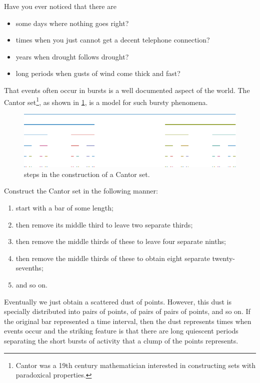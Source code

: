 \documentclass[11pt,a4paper]{article}
\begin{document}
Have you ever noticed that there are    
\begin{itemize}
	\item  some days where nothing goes right?

	\item  times when you just cannot get a decent telephone connection?

	\item  years when drought follows drought?

	\item  long periods when gusts of wind come thick and fast?
\end{itemize}
That events often occur in bursts 
is a well documented aspect of the world.  The Cantor 
set\footnote{Cantor was a 19th century mathematician interested in 
constructing sets with paradoxical properties.}, as shown in 
\cref{F:cantor}, is a model 
for such bursty phenomena.  
\begin{figure}
	\centering
    \includegraphics{cantor}
	\caption{steps in the construction of a Cantor set.}
	\label{F:cantor}
\end{figure}
Construct the Cantor set in the following 
manner:
\begin{enumerate}
	\item  start with a bar of some length; 

	\item  then remove its middle third to leave two separate thirds; 

	\item  then remove the middle thirds of these to leave four separate ninths; 

	\item  then remove the middle thirds of these to 
	obtain eight separate twenty-sevenths; 

	\item  and so on.  
\end{enumerate}
Eventually we just 
obtain a scattered dust of points.  However, this dust is specially 
distributed into pairs of points, of pairs of pairs of points, and so 
on.  If the original bar represented a time interval, then the dust 
represents times when events occur and the striking feature is that 
there are long quiescent periods separating the short bursts of 
activity that a clump of the points represents.
\end{document}
